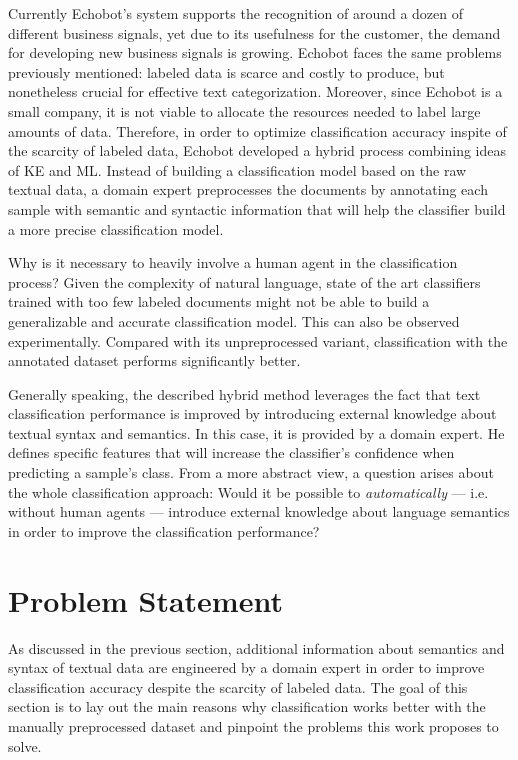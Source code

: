 Currently Echobot's system supports the recognition of around a dozen of 
different business signals, yet due to its usefulness for the customer, the
demand for developing new business signals is growing. 
Echobot faces the same problems previously mentioned: labeled data is scarce and
costly to produce, but nonetheless crucial for effective text categorization.
Moreover, since Echobot is a small company, it is not viable to allocate the 
resources needed to label large amounts of data. Therefore, in order to optimize
classification accuracy inspite of the scarcity of labeled data, Echobot developed 
a hybrid process combining ideas of KE and ML. Instead of building a
classification model based on the raw textual data, a domain expert
preprocesses the documents by annotating each sample with semantic and
syntactic information that will help the classifier build a more precise
classification model.

Why is it necessary to heavily involve a human agent in the classification
process? Given the complexity of natural language, state of the art
classifiers trained with too few labeled documents might not be able to build a
generalizable and accurate classification model. This can also be observed
experimentally. Compared with its unpreprocessed variant, classification
with the annotated dataset performs significantly better.

Generally speaking, the described hybrid method leverages the fact that text
classification performance is improved by introducing external knowledge
about textual syntax and semantics. In this case, it is provided by a domain expert.
He defines specific features that will increase the classifier's confidence when
predicting a sample's class.
From a more abstract view, a question arises about the whole classification
approach: Would it be possible to \textit{automatically} --- i.e. without human
agents --- introduce external knowledge about language semantics in order to
improve the classification performance?  

\section{Problem Statement}

 As discussed in the previous section, additional information about semantics
 and syntax of textual data are engineered by a domain expert in order to
 improve classification accuracy despite the scarcity of labeled data. The goal
 of this section is to lay out the main reasons why classification works better with 
 the manually preprocessed  dataset and pinpoint the problems this work proposes
 to solve.
 
